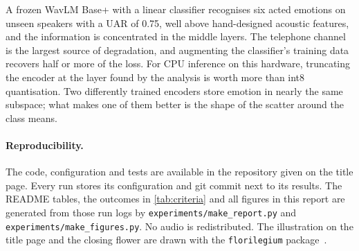 \documentclass[11pt,a4paper]{article}
\begin{document}
A frozen WavLM Base+ with a linear classifier recognises six acted emotions on unseen speakers
with a UAR of 0.75, well above hand-designed acoustic features, and the information is
concentrated in the middle layers. The telephone channel is the largest source of degradation,
and augmenting the classifier's training data recovers half or more of the loss. For CPU inference on this
hardware, truncating the encoder at the layer found by the analysis is worth more than int8
quantisation. Two differently trained encoders store emotion in nearly the same subspace; what
makes one of them better is the shape of the scatter around the class means.

\paragraph{Reproducibility.} The code, configuration and tests are available in the repository
given on the title page. Every run stores its configuration and git commit next to its results.
The README tables, the outcomes in \cref{tab:criteria} and all figures in this report are
generated from those run logs by \texttt{experiments/make\_report.py} and
\texttt{experiments/make\_figures.py}. No audio is redistributed. The illustration on the title
page and the closing flower are drawn with the \texttt{florilegium} package~\citep{florilegium}.

{\small
\setlength{\bibsep}{2pt plus 1pt}


}

\nopagebreak\vspace{0.6em}
\nopagebreak\begin{center}\end{center}
\end{document}
